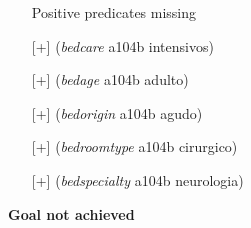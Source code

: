 \documentclass{article}
\begin{document}
\begin{itemize}
\begin{itemize}
	\item[\textbullet] Positive predicates missing
	\item[\textbullet] [+] (\textit{bedcare} a104b intensivos)
	\item[\textbullet] [+] (\textit{bedage} a104b adulto)
	\item[\textbullet] [+] (\textit{bedorigin} a104b agudo)
	\item[\textbullet] [+] (\textit{bedroomtype} a104b cirurgico)
	\item[\textbullet] [+] (\textit{bedspecialty} a104b neurologia)
\end{itemize}
\end{itemize}

\hline
\vspace{10pt}
\large \textbf{Goal not achieved}
\end{document}
